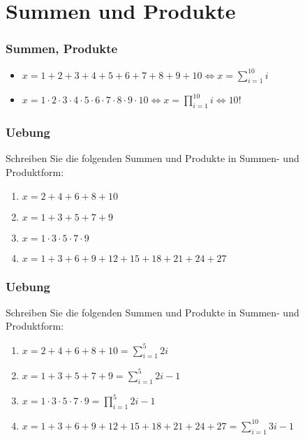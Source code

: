 \section{Summen und Produkte}
\begin{frame}
    \frametitle{Summen, Produkte}
    \begin{itemize}
        \item $x = 1+2+3+4+5+6+7+8+9+10 \iff x = \sum_{i=1}^{10} i$
        \item $x = 1 \cdot 2 \cdot 3 \cdot 4 \cdot 5 \cdot 6 \cdot 7 \cdot 8 \cdot 9 \cdot 10 \iff x = \prod_{i=1}^{10} i \iff 10!$
    \end{itemize}
\end{frame}

\begin{frame}
    \frametitle{Uebung}
    Schreiben Sie die folgenden Summen und Produkte in Summen- und Produktform:
    \begin{enumerate}
        \item $x = 2+4+6+8+10$
        \item $x = 1+3+5+7+9$
        \item $x = 1 \cdot 3 \cdot 5 \cdot 7 \cdot 9$
        \item $x = 1+3+6+9+12+15+18+21+24+27$
    \end{enumerate}
\end{frame}

\begin{frame}
    \frametitle{Uebung}
    Schreiben Sie die folgenden Summen und Produkte in Summen- und Produktform:
    \begin{enumerate}
        \item $x = 2+4+6+8+10 = \sum_{i=1}^{5} 2i$
        \item $x = 1+3+5+7+9 = \sum_{i=1}^{5} 2i-1$
        \item $x = 1 \cdot 3 \cdot 5 \cdot 7 \cdot 9 = \prod_{i=1}^{5} 2i-1$
        \item $x = 1+3+6+9+12+15+18+21+24+27 = \sum_{i=1}^{10} 3i-1$
    \end{enumerate}
\end{frame}